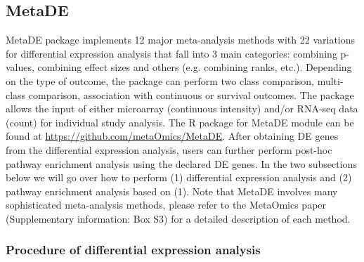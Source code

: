 \subsection{MetaDE}

MetaDE package implements 12 major meta-analysis methods with 22 variations for differential expression analysis that fall into 3 main categories: combining p-values, combining effect sizes and others (e.g. combining ranks, etc.). Depending on the type of outcome, the package can perform two class comparison, multi-class comparison, association with continuous or survival outcomes. The package allows the input of either microarray (continuous intensity) and/or RNA-seq data (count) for individual study analysis. 
The R package for MetaDE module can be found at \url{https://github.com/metaOmics/MetaDE}.
After obtaining DE genes from the differential expression analysis, 
users can further perform post-hoc pathway enrichment analysis using the declared DE genes.
In the two subsections below we will go over how to perform (1) differential expression analysis and (2) pathway enrichment analysis based on (1).
Note that 
MetaDE involves many sophisticated meta-analysis methods, please refer to the MetaOmics paper (Supplementary information: Box S3) for a detailed description of each method. 

\subsubsection{Procedure of differential expression analysis}

